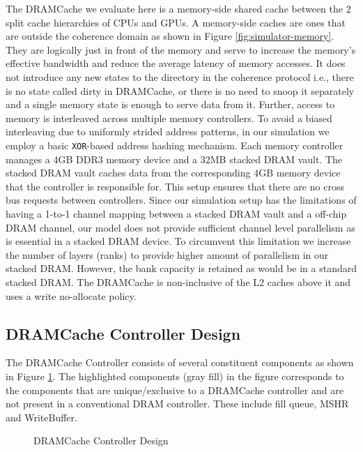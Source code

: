 \par The DRAMCache we evaluate here is a memory-side \cite{skylake,mainak-hpca} shared cache between the 2 split cache hierarchies of CPUs and GPUs. A memory-side caches are ones that are outside the coherence domain as shown in Figure \ref{fig:simulator-memory}. They are logically just in front of the memory and serve to increase the memory's effective bandwidth and reduce the average latency of memory accesses. It does not introduce any new states to the directory in the coherence protocol i.e., there is no state called dirty in DRAMCache, or there is no need to snoop it separately and a single memory state is enough to serve data from it. Further, access to memory is interleaved across multiple memory controllers. To avoid a biased interleaving due to uniformly strided address patterns, in our simulation we employ a basic {\tt XOR}-based address hashing mechanism. Each memory controller manages a 4GB DDR3 memory device and a 32MB stacked DRAM vault. The stacked DRAM vault caches data from the corresponding 4GB memory device that the controller is responsible for. This setup ensures that there are no cross bus requests between controllers. Since our simulation setup has the limitations of having a 1-to-1 channel mapping between a stacked DRAM vault and a off-chip DRAM channel, our model does not provide sufficient channel level parallelism as is essential in a stacked DRAM device. To circumvent this limitation we increase the number of layers (ranks) to provide higher amount of parallelism in our stacked DRAM. However, the bank capacity is retained as would be in a standard stacked DRAM. The DRAMCache is non-inclusive  \cite{coherence-dramcache} of the L2 caches above it and uses a write no-allocate policy. 

\subsection{DRAMCache Controller Design}
The DRAMCache Controller consists of several constituent components as shown in Figure \ref{fig:dramcache-ctrl}. The highlighted components (gray fill) in the figure corresponds to the components that are unique/exclusive to a DRAMCache controller and are not present in a conventional DRAM controller. These include fill queue, MSHR and WriteBuffer.

\begin{figure}[!htb]
	\centering
	\def\svgwidth{\columnwidth}
	
	\caption{DRAMCache Controller Design}
	\label{fig:dramcache-ctrl}
\end{figure}

